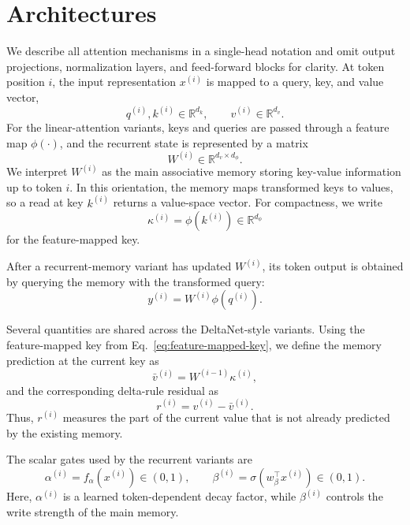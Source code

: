 \documentclass{article}
\newcommand{\phiMap}{\phi}
\begin{document}
\section{Architectures}

We describe all attention mechanisms in a single-head notation and omit output projections, normalization layers, and feed-forward blocks for clarity. At token position $i$, the input representation $x^{(i)}$ is mapped to a query, key, and value vector,
\[
q^{(i)}, k^{(i)} \in \mathbb{R}^{d_k},
\qquad
v^{(i)} \in \mathbb{R}^{d_v}.
\]
For the linear-attention variants, keys and queries are passed through a feature map $\phiMap(\cdot)$, and the recurrent state is represented by a matrix
\[
W^{(i)} \in \mathbb{R}^{d_v \times d_\phi}.
\]
We interpret $W^{(i)}$ as the main associative memory storing key-value information up to token $i$. In this orientation, the memory maps transformed keys to values, so a read at key $k^{(i)}$ returns a value-space vector. For compactness, we write
\begin{equation}
\label{eq:feature-mapped-key}
\kappa^{(i)}
=
\phiMap\!\left(k^{(i)}\right)
\in \mathbb{R}^{d_\phi}
\end{equation}
for the feature-mapped key.

After a recurrent-memory variant has updated $W^{(i)}$, its token output is obtained by querying the memory with the transformed query:
\begin{equation}
\label{eq:common-output-read}
y^{(i)}
=
W^{(i)}
\phiMap\!\left(q^{(i)}\right).
\end{equation}

Several quantities are shared across the DeltaNet-style variants. Using the feature-mapped key from Eq.~\eqref{eq:feature-mapped-key}, we define the memory prediction at the current key as
\begin{equation}
\label{eq:memory-prediction}
\bar v^{(i)}
=
W^{(i-1)} \kappa^{(i)},
\end{equation}
and the corresponding delta-rule residual as
\begin{equation}
\label{eq:delta-residual}
r^{(i)}
=
v^{(i)} - \bar v^{(i)}.
\end{equation}
Thus, $r^{(i)}$ measures the part of the current value that is not already predicted by the existing memory.

The scalar gates used by the recurrent variants are
\begin{equation}
\label{eq:scalar-gates}
\alpha^{(i)}
=
f_{\alpha}\!\left(x^{(i)}\right)
\in (0,1),
\qquad
\beta^{(i)}
=
\sigma\!\left(w_{\beta}^{\top} x^{(i)}\right)
\in (0,1).
\end{equation}
Here, $\alpha^{(i)}$ is a learned token-dependent decay factor, while $\beta^{(i)}$ controls the write strength of the main memory.
\end{document}
